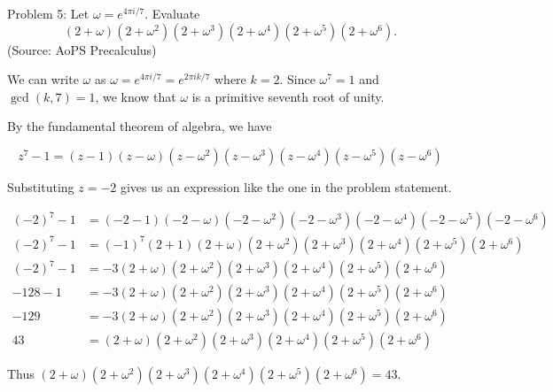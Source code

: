 Problem 5: Let $\omega = e^{4\pi i/7}$. Evaluate\[ (2+\omega)(2+\omega^2)(2+\omega^3)(2+\omega^4)(2+\omega^5)(2+\omega^6). \] (Source: AoPS Precalculus)

We can write $\omega$ as $\omega = e^{4\pi i / 7} = e^{2 \pi i k /7}$ where $k = 2$. Since $\omega^7 = 1$ and $\gcd(k, 7) = 1$, we know that $\omega$ is a primitive seventh root of unity.

By the fundamental theorem of algebra, we have

$$ z^7 - 1 = (z - 1)(z - \omega)(z - \omega^2)(z - \omega^3)(z - \omega^4)(z - \omega^5)(z - \omega^6) $$

Substituting $z = -2$ gives us an expression like the one in the problem statement.

\begin{align*}
(-2)^7 - 1 &= (-2 - 1)(-2 - \omega)(-2 - \omega^2)(-2 - \omega^3)(-2 - \omega^4)(-2 - \omega^5)(-2 - \omega^6) \\
(-2)^7 - 1 &= (-1)^7 (2 + 1)(2 + \omega)(2 + \omega^2)(2 + \omega^3)(2 + \omega^4)(2 + \omega^5)(2 + \omega^6) \\
(-2)^7 - 1 &= -3(2 + \omega)(2 + \omega^2)(2 + \omega^3)(2 + \omega^4)(2 + \omega^5)(2 + \omega^6) \\
-128 - 1 &= -3(2 + \omega)(2 + \omega^2)(2 + \omega^3)(2 + \omega^4)(2 + \omega^5)(2 + \omega^6) \\
-129 &= -3(2 + \omega)(2 + \omega^2)(2 + \omega^3)(2 + \omega^4)(2 + \omega^5)(2 + \omega^6) \\
43 &= (2 + \omega)(2 + \omega^2)(2 + \omega^3)(2 + \omega^4)(2 + \omega^5)(2 + \omega^6)
\end{align*}

Thus $\boxed{(2 + \omega)(2 + \omega^2)(2 + \omega^3)(2 + \omega^4)(2 + \omega^5)(2 + \omega^6) = 43}$.
